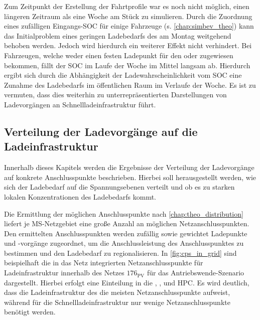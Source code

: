 

Zum Zeitpunkt der Erstellung der Fahrtprofile war es noch nicht möglich, einen längeren Zeitraum als eine Woche am Stück zu simulieren.
Durch die Zuordnung eines zufälligen Eingangs-\gls{SOC} für einige Fahrzeuge (s. \autoref{chap:simbev_theo}) kann das Initialproblem eines geringen Ladebedarfs des \UC \Firmeparkplatz am Montag weitgehend behoben werden.
Jedoch wird hierdurch ein weiterer Effekt nicht verhindert.
Bei Fahrzeugen, welche weder einen festen Ladepunkt für den \UC \zH oder \Firmeparkplatz zugewiesen bekommen, fällt der \gls{SOC} im Laufe der Woche im Mittel langsam ab.
Hierdurch ergibt sich durch die Abhängigkeit der Ladewahrscheinlichkeit vom \gls{SOC} eine Zunahme des Ladebedarfs im öffentlichen Raum im Verlaufe der Woche.
Es ist zu vermuten, dass dies weiterhin zu un­ter­re­prä­sen­tierten Darstellungen von Ladevorgängen an Schnellladeinfrastruktur führt.


\subsection{Verteilung der Ladevorgänge auf die Ladeinfrastruktur}\label{chap:distribute_demand_ev}

Innerhalb dieses Kapitels werden die Ergebnisse der Verteilung der Ladevorgänge auf konkrete Anschlusspunkte beschrieben.
Hierbei soll herausgestellt werden, wie sich der Ladebedarf auf die Spannungsebenen verteilt und ob es zu starken lokalen Konzentrationen des Ladebedarfs kommt.\medskip

Die Ermittlung der möglichen Anschlusspunkte nach \autoref{chap:theo_distribution} liefert je \gls{MS}-Netzgebiet eine große Anzahl an möglichen Netzanschlusspunkten.
Den ermittelten Anschlusspunkten werden zufällig sowie gewichtet Ladepunkte und -vorgänge zugeordnet, um die Anschlussleistung des Anschlusspunktes zu bestimmen und den Ladebedarf zu regionalisieren.
In \autoref{fig:cps_in_grid} sind beispielhaft die in das Netz integrierten Netzanschlusspunkte für Ladeinfrastruktur innerhalb des Netzes \(176_{\text{PV}}\) für das Antriebswende-Szenario dargestellt.
Hierbei erfolgt eine Einteilung in die \UCs \zHdot, \Firmeparkplatzdot, \oeffen und \gls{HPC}.
Es wird deutlich, dass die Ladeinfrastruktur des \UC \zH die meisten Netzanschlusspunkte aufweist, während für die Schnellladeinfrastruktur nur wenige Netzanschlusspunkte benötigt werden.



